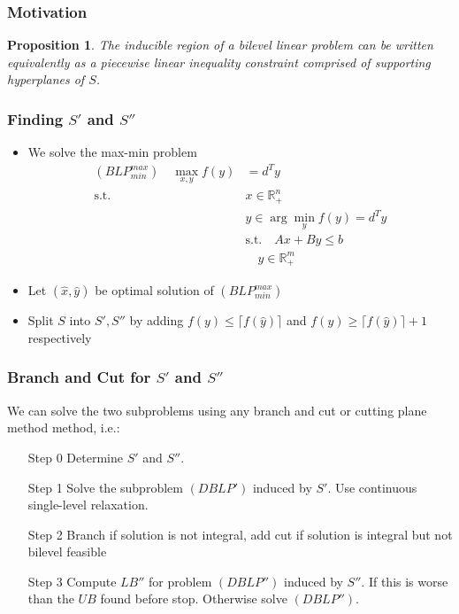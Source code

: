 \documentclass[11pt]{beamer}
\newtheorem{theo}{Proposition}
\begin{document}
\begin{frame}
	\frametitle{Motivation}
	\begin{theo}
		The inducible region of a bilevel linear problem can be written equivalently as a piecewise linear inequality constraint comprised of supporting hyperplanes of $S$.
	\end{theo}
	
	
\end{frame}

\begin{frame}
	\frametitle{Finding $S'$ and $S''$}
	\begin{itemize}
	\item We solve the max-min problem
		\begin{align*}
			(BLP^{max}_{min}) \quad \max_{x,y} f(y) &= d^T y \\
			\text{s.t.} \quad &x \in \mathbb{R}^n_{+} \\
			&y \in \arg \min_{y} f(y) = d^Ty \\
			&\text{s.t.} \quad Ax + By \le b \\
			& \quad y \in \mathbb{R}^m_{+}
		\end{align*}
		\item Let $(\hat x, \hat y)$ be optimal solution of $(BLP^{max}_{min})$
		\item Split $S$ into $S', S''$ by adding $f(y) \le \lceil f(\hat y) \rceil$ and $f(y) \ge \lceil f(\hat y) \rceil + 1$ respectively
	\end{itemize}
\end{frame}

\begin{frame}
	\frametitle{Branch and Cut for $S'$ and $S''$}
	We can solve the two subproblems using any branch and cut or cutting plane method method, i.e.:
	\begin{itemize}
		\item[Step 0]Determine $S'$ and $S''$.
		\item[Step 1]Solve the subproblem $(DBLP')$ induced by $S'$. Use continuous single-level relaxation. 
		\item[Step 2]Branch if solution is not integral, add cut if solution is integral but not bilevel feasible
		\item[Step 3]Compute $LB''$ for problem $(DBLP'')$ induced by $S''$. If this is worse than the $UB$ found before stop.
		Otherwise solve $(DBLP'')$.
	\end{itemize}
\end{frame}
\end{document}
